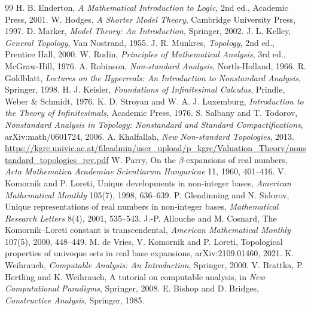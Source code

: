 \documentclass[a4paper,11pt]{ltjsarticle}
\theoremstyle{jpdef}
\theoremstyle{jpthm}
\begin{document}
\begin{thebibliography}{99}
 H. B. Enderton, \textit{A Mathematical Introduction to Logic}, 2nd ed., Academic Press, 2001.
 W. Hodges, \textit{A Shorter Model Theory}, Cambridge University Press, 1997.
 D. Marker, \textit{Model Theory: An Introduction}, Springer, 2002.
 J. L. Kelley, \textit{General Topology}, Van Nostrand, 1955.
 J. R. Munkres, \textit{Topology}, 2nd ed., Prentice Hall, 2000.
 W. Rudin, \textit{Principles of Mathematical Analysis}, 3rd ed., McGraw-Hill, 1976.
 A. Robinson, \textit{Non-standard Analysis}, North-Holland, 1966.
 R. Goldblatt, \textit{Lectures on the Hyperreals: An Introduction to Nonstandard Analysis}, Springer, 1998.
 H. J. Keisler, \textit{Foundations of Infinitesimal Calculus}, Prindle, Weber \& Schmidt, 1976.
 K. D. Stroyan and W. A. J. Luxemburg, \textit{Introduction to the Theory of Infinitesimals}, Academic Press, 1976.
 S. Salbany and T. Todorov, \textit{Nonstandard Analysis in Topology: Nonstandard and Standard Compactifications}, arXiv:math/0601724, 2006.
 A. Khalfallah, \textit{New Non-standard Topologies}, 2013. \url{https://kgrc.univie.ac.at/fileadmin/user_upload/p_kgrc/Valuation_Theory/nonstandard_topologies_rev.pdf}
 W. Parry, On the \(\beta\)-expansions of real numbers, \textit{Acta Mathematica Academiae Scientiarum Hungaricae} 11, 1960, 401--416.
 V. Komornik and P. Loreti, Unique developments in non-integer bases, \textit{American Mathematical Monthly} 105(7), 1998, 636--639.
 P. Glendinning and N. Sidorov, Unique representations of real numbers in non-integer bases, \textit{Mathematical Research Letters} 8(4), 2001, 535--543.
 J.-P. Allouche and M. Cosnard, The Komornik--Loreti constant is transcendental, \textit{American Mathematical Monthly} 107(5), 2000, 448--449.
 M. de Vries, V. Komornik and P. Loreti, Topological properties of univoque sets in real base expansions, arXiv:2109.01460, 2021.
 K. Weihrauch, \textit{Computable Analysis: An Introduction}, Springer, 2000.
 V. Brattka, P. Hertling and K. Weihrauch, A tutorial on computable analysis, in \textit{New Computational Paradigms}, Springer, 2008.
 E. Bishop and D. Bridges, \textit{Constructive Analysis}, Springer, 1985.

\end{thebibliography}
\end{document}

